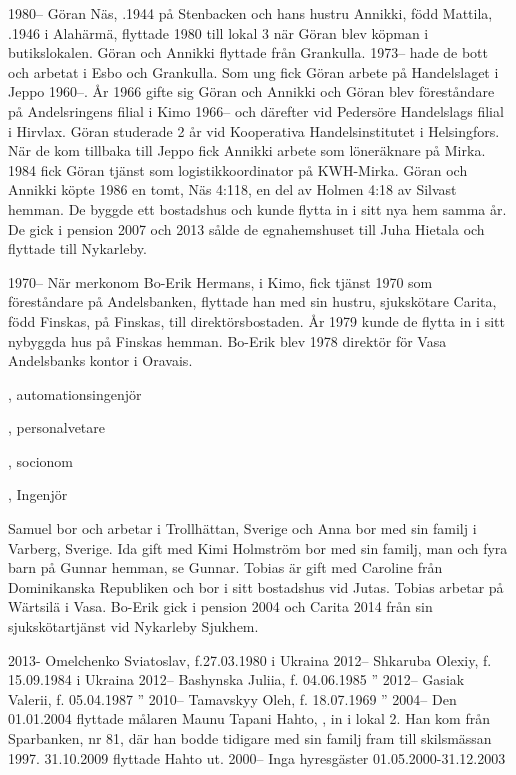 1980--
Göran Näs, .1944 på Stenbacken och hans hustru Annikki, född Mattila, .1946 i Alahärmä, flyttade 1980 till lokal 3 när Göran blev köpman i butikslokalen. Göran och Annikki flyttade från Grankulla. 1973-- hade de bott och arbetat i Esbo och Grankulla. Som ung fick Göran arbete på Handelslaget i Jeppo 1960--. År 1966 gifte sig Göran	och Annikki och Göran blev föreståndare på Andelsringens filial i Kimo 1966-- och därefter vid Pedersöre Handelslags filial i Hirvlax. Göran studerade 2 år vid Kooperativa Handelsinstitutet i Helsingfors. När de 	kom tillbaka till Jeppo fick Annikki arbete som löneräknare på Mirka. 1984 fick Göran tjänst som logistikkoordinator på KWH-Mirka. Göran och Annikki köpte 1986 en tomt, Näs 4:118, en del av Holmen 4:18	av Silvast hemman. De byggde ett bostadshus och kunde flytta in i sitt nya hem samma år. De gick i pension 2007 och 2013 sålde de egnahemshuset till Juha Hietala och flyttade till Nykarleby.

1970--
När merkonom Bo-Erik Hermans,  i Kimo, fick tjänst 1970	som föreståndare på Andelsbanken, flyttade han med sin hustru,	sjukskötare Carita, född Finskas,  på Finskas, till direktörsbostaden. År 1979 kunde de flytta in i sitt nybyggda hus på Finskas hemman. Bo-Erik blev 1978 direktör för Vasa Andelsbanks kontor i Oravais.
\begin{jhchildren}
  \item {}, automationsingenjör
  \item {}, personalvetare
  \item {}, socionom
  \item {}, Ingenjör
\end{jhchildren}
Samuel bor och arbetar i Trollhättan, Sverige och Anna bor med sin 	familj i Varberg, Sverige. Ida gift med Kimi Holmström bor med sin familj, man och fyra barn på Gunnar hemman, se Gunnar. Tobias är gift	med Caroline från Dominikanska Republiken och bor i sitt bostadshus vid Jutas. Tobias arbetar på Wärtsilä i Vasa. Bo-Erik gick i pension 2004 och Carita 2014 från sin sjukskötartjänst vid Nykarleby Sjukhem.


2013-       Omelchenko Sviatoslav,  f.27.03.1980 i Ukraina
2012--   Shkaruba Olexiy,        f. 15.09.1984 i Ukraina
2012--   Bashynska Juliia,       f. 04.06.1985     ''
2012--   Gasiak Valerii,         f. 05.04.1987     ''
2010--   Tamavskyy Oleh,         f. 18.07.1969     ''
2004--   Den 01.01.2004 flyttade målaren Maunu Tapani Hahto, , in i lokal 2. Han kom från Sparbanken, nr 81, där han bodde tidigare med sin familj fram till skilsmässan 1997. 31.10.2009 flyttade Hahto ut.
2000--	  Inga hyresgäster 01.05.2000-31.12.2003

